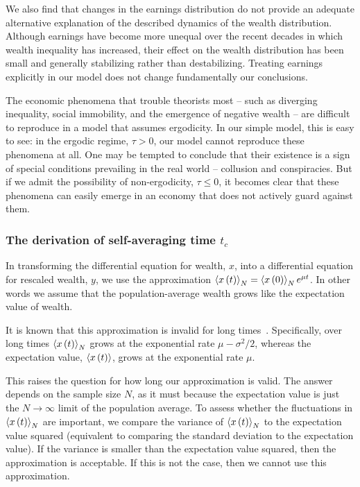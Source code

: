 We also find that changes in the earnings distribution do not provide an adequate alternative explanation of the described dynamics of the wealth distribution. Although earnings have become more unequal over the recent decades in which wealth inequality has increased, their effect on the wealth distribution has been small and generally stabilizing rather than destabilizing. Treating earnings explicitly in our model does not change fundamentally our conclusions.

The economic phenomena that trouble theorists most -- such as diverging inequality, social immobility, and the emergence of negative wealth -- are difficult to reproduce in a model that assumes ergodicity. In our simple model, this is easy to see: in the ergodic regime, $\tau>0$, our model cannot reproduce these phenomena at all. One may be tempted to conclude that their existence is a sign of special conditions prevailing in the real world -- collusion and conspiracies. But if we admit the possibility of non-ergodicity, $\tau\leq0$, it becomes clear that these phenomena can easily emerge in an economy that does not actively guard against them.

\subsubsection{The derivation of self-averaging time $t_c$}\label{app:tauc}

In transforming the differential equation for wealth, $x$, into a differential equation for rescaled wealth, $y$, we use the approximation $\left\langle x\left(t\right) \right\rangle_N=\left\langle x\left(0\right) \right\rangle_N e^{\mu t}$. In other words we assume that the population-average wealth grows like the expectation value of wealth. 

It is known that this approximation is invalid for long times~\cite{PetersKlein2013}. Specifically, over long times $\left\langle x\left(t\right) \right\rangle_N$ grows at the exponential rate $\mu-\sigma^2/2$, whereas the expectation value, $\left\langle x\left(t\right) \right\rangle$, grows at the exponential rate $\mu$.

This raises the question for how long our approximation is valid. 
The answer depends on the sample size $N$, as it must because the expectation value is just the $N\to\infty$ limit of the population average.
To assess whether the fluctuations in $\left\langle x\left(t\right) \right\rangle_N$ are important, we compare the variance of $\left\langle x\left(t\right) \right\rangle_N$ to the expectation value squared (equivalent to comparing the standard deviation to the expectation value). 
If the variance is smaller than the expectation value squared, then the approximation is acceptable. 
If this is not the case, then we cannot use this approximation.

